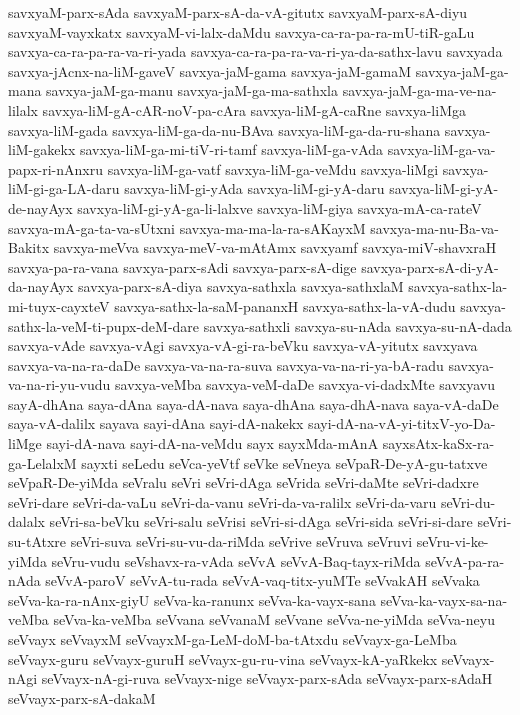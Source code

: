 {savxyaM-parx-sAda
savxyaM-parx-sA-da-vA-gitutx
savxyaM-parx-sA-diyu
savxyaM-vayxkatx
savxyaM-vi-lalx-daMdu
savxya-ca-ra-pa-ra-mU-tiR-gaLu
savxya-ca-ra-pa-ra-va-ri-yada
savxya-ca-ra-pa-ra-va-ri-ya-da-sathx-lavu
savxyada
savxya-jAcnx-na-liM-gaveV
savxya-jaM-gama
savxya-jaM-gamaM
savxya-jaM-ga-mana
savxya-jaM-ga-manu
savxya-jaM-ga-ma-sathxla
savxya-jaM-ga-ma-ve-na-lilalx
savxya-liM-gA-cAR-noV-pa-cAra
savxya-liM-gA-caRne
savxya-liMga
savxya-liM-gada
savxya-liM-ga-da-nu-BAva
savxya-liM-ga-da-ru-shana
savxya-liM-gakekx
savxya-liM-ga-mi-tiV-ri-tamf
savxya-liM-ga-vAda
savxya-liM-ga-va-papx-ri-nAnxru
savxya-liM-ga-vatf
savxya-liM-ga-veMdu
savxya-liMgi
savxya-liM-gi-ga-LA-daru
savxya-liM-gi-yAda
savxya-liM-gi-yA-daru
savxya-liM-gi-yA-de-nayAyx
savxya-liM-gi-yA-ga-li-lalxve
savxya-liM-giya
savxya-mA-ca-rateV
savxya-mA-ga-ta-va-sUtxni
savxya-ma-ma-la-ra-sAKayxM
savxya-ma-nu-Ba-va-Bakitx
savxya-meVva
savxya-meV-va-mAtAmx
savxyamf
savxya-miV-shavxraH
savxya-pa-ra-vana
savxya-parx-sAdi
savxya-parx-sA-dige
savxya-parx-sA-di-yA-da-nayAyx
savxya-parx-sA-diya
savxya-sathxla
savxya-sathxlaM
savxya-sathx-la-mi-tuyx-cayxteV
savxya-sathx-la-saM-pananxH
savxya-sathx-la-vA-dudu
savxya-sathx-la-veM-ti-pupx-deM-dare
savxya-sathxli
savxya-su-nAda
savxya-su-nA-dada
savxya-vAde
savxya-vAgi
savxya-vA-gi-ra-beVku
savxya-vA-yitutx
savxyava
savxya-va-na-ra-daDe
savxya-va-na-ra-suva
savxya-va-na-ri-ya-bA-radu
savxya-va-na-ri-yu-vudu
savxya-veMba
savxya-veM-daDe
savxya-vi-dadxMte
savxyavu
sayA-dhAna
saya-dAna
saya-dA-nava
saya-dhAna
saya-dhA-nava
saya-vA-daDe
saya-vA-dalilx
sayava
sayi-dAna
sayi-dA-nakekx
sayi-dA-na-vA-yi-titxV-yo-Da-liMge
sayi-dA-nava
sayi-dA-na-veMdu
sayx
sayxMda-mAnA
sayxsAtx-kaSx-ra-ga-LelalxM
sayxti
seLedu
seVca-yeVtf
seVke
seVneya
seVpaR-De-yA-gu-tatxve
seVpaR-De-yiMda
seVralu
seVri
seVri-dAga
seVrida
seVri-daMte
seVri-dadxre
seVri-dare
seVri-da-vaLu
seVri-da-vanu
seVri-da-va-ralilx
seVri-da-varu
seVri-du-dalalx
seVri-sa-beVku
seVri-salu
seVrisi
seVri-si-dAga
seVri-sida
seVri-si-dare
seVri-su-tAtxre
seVri-suva
seVri-su-vu-da-riMda
seVrive
seVruva
seVruvi
seVru-vi-ke-yiMda
seVru-vudu
seVshavx-ra-vAda
seVvA
seVvA-Baq-tayx-riMda
seVvA-pa-ra-nAda
seVvA-paroV
seVvA-tu-rada
seVvA-vaq-titx-yuMTe
seVvakAH
seVvaka
seVva-ka-ra-nAnx-giyU
seVva-ka-ranunx
seVva-ka-vayx-sana
seVva-ka-vayx-sa-na-veMba
seVva-ka-veMba
seVvana
seVvanaM
seVvane
seVva-ne-yiMda
seVva-neyu
seVvayx
seVvayxM
seVvayxM-ga-LeM-doM-ba-tAtxdu
seVvayx-ga-LeMba
seVvayx-guru
seVvayx-guruH
seVvayx-gu-ru-vina
seVvayx-kA-yaRkekx
seVvayx-nAgi
seVvayx-nA-gi-ruva
seVvayx-nige
seVvayx-parx-sAda
seVvayx-parx-sAdaH
seVvayx-parx-sA-dakaM
}
